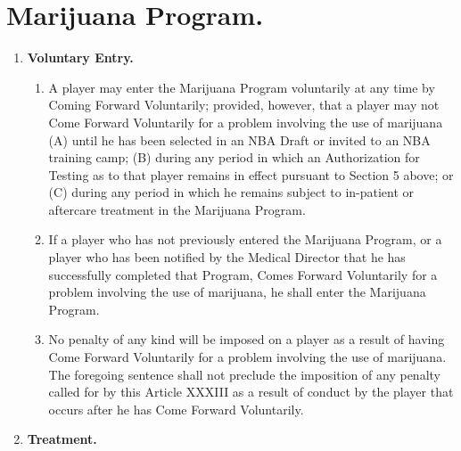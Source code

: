 \documentclass[
]{book}
\providecommand{\tightlist}{%
  \setlength{\itemsep}{0pt}\setlength{\parskip}{0pt}}
\begin{document}
\hypertarget{marijuana-program.}{%
\section{Marijuana Program.}\label{marijuana-program.}}

\begin{enumerate}
\def\labelenumi{(\alph{enumi})}
\item
  \textbf{Voluntary Entry.}

  \begin{enumerate}
  \def\labelenumii{(\roman{enumii})}
  \tightlist
  \item
    A player may enter the Marijuana Program voluntarily at any time by Coming Forward Voluntarily; provided, however, that a player may not Come Forward Voluntarily for a problem involving the use of marijuana (A) until he has been selected in an NBA Draft or invited to an NBA training camp; (B) during any period in which an Authorization for Testing as to that player remains in effect pursuant to Section 5 above; or (C) during any period in which he remains subject to in-patient or aftercare treatment in the Marijuana Program.
  \item
    If a player who has not previously entered the Marijuana Program, or a player who has been notified by the Medical Director that he has successfully completed that Program, Comes Forward Voluntarily for a problem involving the use of marijuana, he shall enter the Marijuana Program.
  \item
    No penalty of any kind will be imposed on a player as a result of having Come Forward Voluntarily for a problem involving the use of marijuana. The foregoing sentence shall not preclude the imposition of any penalty called for by this Article XXXIII as a result of conduct by the player that occurs after he has Come Forward Voluntarily.
  \end{enumerate}
\item
  \textbf{Treatment.}


\end{enumerate}
\end{document}

